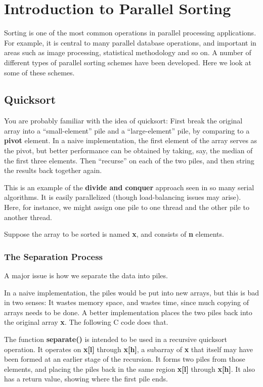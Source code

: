 \chapter{Introduction to Parallel Sorting} 
\label{chap:sort}

Sorting is one of the most common operations in parallel processing
applications.  For example, it is central to many parallel database
operations, and important in areas such as image processing, statistical
methodology and so on.  A number of different types of parallel sorting
schemes have been developed. Here we look at some of these schemes.  

\section{Quicksort}

You are probably familiar with the idea of quicksort: First break the
original array into a ``small-element'' pile and a ``large-element''
pile, by comparing to a {\bf pivot} element.  In a naive implementation,
the first element of the array serves as the pivot, but better
performance can be obtained by taking, say, the median of the first
three elements.  Then ``recurse'' on each of the two piles, and then
string the results back together again.

This is an example of the {\bf divide and conquer} approach seen in so
many serial algorithms.  It is easily parallelized (though
load-balancing issues may arise).  Here, for instance, we might assign
one pile to one thread and the other pile to another thread.

Suppose the array to be sorted is named {\bf x}, and consists of {\bf n}
elements.  

\subsection{The Separation Process}

A major issue is how we separate the data into piles.

In a naive implementation, the piles would be put into new arrays, but
this is bad in two senses:  It wastes memory space, and wastes time,
since much copying of arrays needs to be done.  A better implementation
places the two piles back into the original array {\bf x}.  The
following C code does that.  

The function {\bf separate()} is intended to be used in a recursive
quicksort operation.  It operates on {\bf x[l]} through {\bf x[h]}, a
subarray of {\bf x} that itself may have been formed at an earlier stage
of the recursion.  It forms two piles from those elements, and placing
the piles back in the same region {\bf x[l]} through {\bf x[h]}.  It
also has a return value, showing where the first pile ends.

